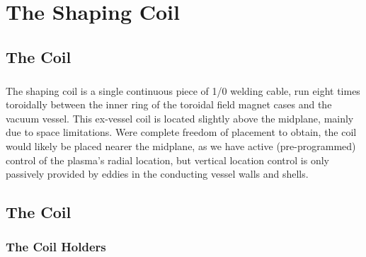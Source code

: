 \chapter{The Shaping Coil}
\section{The Coil}
\paragraph{} The shaping coil is a single continuous piece of 1/0 welding cable, run eight times toroidally between the inner ring of the toroidal field magnet cases and the vacuum vessel.  This ex-vessel coil is located slightly above the midplane, mainly due to space limitations.  Were complete freedom of placement to obtain, the coil would likely be placed nearer the midplane, as we have active (pre-programmed) control of the plasma's radial location, but vertical location control is only passively provided by eddies in the conducting vessel walls and shells.
\section{The Coil}
\subsection{The Coil Holders}
